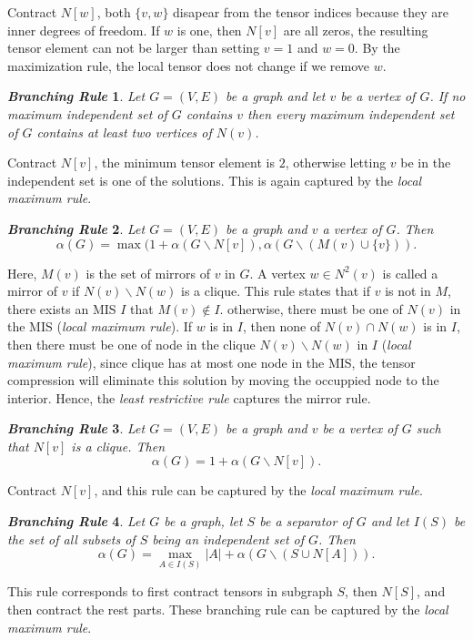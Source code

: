 \documentclass{article}
\newcommand{\<}{\langle}
\renewcommand{\>}{\rangle}
\newtheorem{theorem}{\textit{Branching Rule}}
\theoremstyle{definition}\newtheorem{definition}{\textit{Definition}}
\begin{document}
Contract $N[w]$, both $\{v, w\}$ disapear from the tensor indices because they are inner degrees of freedom.
If $w$ is one, then $N[v]$ are all zeros, the resulting tensor element can not be larger than setting $v=1$ and $w=0$.
By the maximization rule, the local tensor does not change if we remove $w$.

\begin{theorem} %
  Let $G = (V, E)$ be a graph and let $v$ be a vertex of $G$. If no maximum
independent set of $G$ contains $v$ then every maximum independent set of $G$ contains
at least two vertices of $N(v)$.
\end{theorem}
Contract $N[v]$, the minimum tensor element is $2$, otherwise letting $v$ be in the independent set is one of the solutions. This is again captured by the \textit{local maximum rule}.

\begin{theorem} %
Let $G = (V, E)$ be a graph and $v$ a vertex of $G$. Then
\begin{equation}
\alpha(G) = \max(1 + \alpha(G \backslash N[v]), \alpha(G \backslash (M(v) \cup \{v\})).
\end{equation}
\end{theorem}

Here, $M(v)$ is the set of mirrors of $v$ in $G$.
A vertex $w \in N^2(v)$ is called a mirror of $v$ if $N(v) \backslash N(w)$ is a clique.
This rule states that if $v$ is not in $M$, there exists an MIS $I$ that $M(v)\notin I$.
otherwise, there must be one of $N(v)$ in the MIS (\textit{local maximum rule}).
If $w$ is in $I$, then none of $N(v) \cap N(w)$ is in $I$, then there must be one of node in the clique $N(v)\backslash N(w)$ in $I$ (\textit{local maximum rule}),
since clique has at most one node in the MIS, the tensor compression will eliminate this solution by moving the occuppied node to the interior.
Hence, the \textit{least restrictive rule} captures the mirror rule.

\begin{theorem} %
Let $G = (V, E)$ be a graph and $v$ be a vertex of $G$ such that $N[v]$ is a
clique. Then
\begin{equation}
\alpha(G) = 1 + \alpha(G \backslash N[v]).
\end{equation}
\end{theorem}

Contract $N[v]$, and this rule can be captured by the \textit{local maximum rule}.

\begin{theorem}  %
Let $G$ be a graph, let $S$ be a separator of $G$ and let $I(S)$ be the set of
all subsets of $S$ being an independent set of $G$. Then
\begin{equation}
\alpha(G) = \max_{A\in I(S)} |A| + \alpha(G \backslash (S \cup N[A])).
\end{equation}
\end{theorem}
This rule corresponds to first contract tensors in subgraph $S$, then $N[S]$, and then contract the rest parts.
These branching rule can be captured by the \textit{local maximum rule}.
\end{document}
